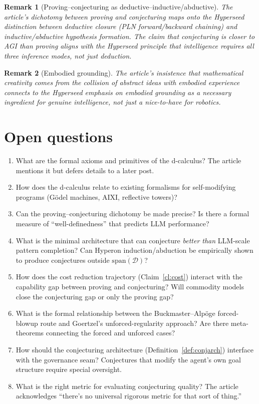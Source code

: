 \documentclass[11pt]{article}
\newtheorem{remark}{Remark}
\begin{document}
\begin{remark}[Proving--conjecturing as deductive--inductive/abductive]
The article's dichotomy between proving and conjecturing maps onto the
Hyperseed distinction between deductive closure (PLN forward/backward
chaining) and inductive/abductive hypothesis formation.  The claim that
conjecturing is closer to AGI than proving aligns with the Hyperseed
principle that intelligence requires all three inference modes, not just
deduction.
\end{remark}

\begin{remark}[Embodied grounding]
The article's insistence that mathematical creativity comes from the
collision of abstract ideas with embodied experience connects to the
Hyperseed emphasis on embodied grounding as a necessary ingredient for
genuine intelligence, not just a nice-to-have for robotics.
\end{remark}


\section{Open questions}

\begin{enumerate}
  \item What are the formal axioms and primitives of the d-calculus?
    The article mentions it but defers details to a later post.
  \item How does the d-calculus relate to existing formalisms for
    self-modifying programs (G\"odel machines, AIXI, reflective
    towers)?
  \item Can the proving--conjecturing dichotomy be made precise?  Is
    there a formal measure of ``well-definedness'' that predicts LLM
    performance?
  \item What is the minimal architecture that can conjecture
    \emph{better than} LLM-scale pattern completion?  Can Hyperon
    induction/abduction be empirically shown to produce conjectures
    outside $\overline{\mathrm{span}(\mathcal{D})}$?
  \item How does the cost reduction trajectory (Claim~\ref{cl:cost})
    interact with the capability gap between proving and conjecturing?
    Will commodity models close the conjecturing gap or only the
    proving gap?
  \item What is the formal relationship between the Buckmaster--Alp\"oge
    forced-blowup route and Goertzel's unforced-regularity approach?
    Are there meta-theorems connecting the forced and unforced cases?
  \item How should the conjecturing architecture
    (Definition~\ref{def:conjarch}) interface with the governance seam?
    Conjectures that modify the agent's own goal structure require
    special oversight.
  \item What is the right metric for evaluating conjecturing quality?
    The article acknowledges ``there's no universal rigorous metric
    for that sort of thing.''
\end{enumerate}
\end{document}
